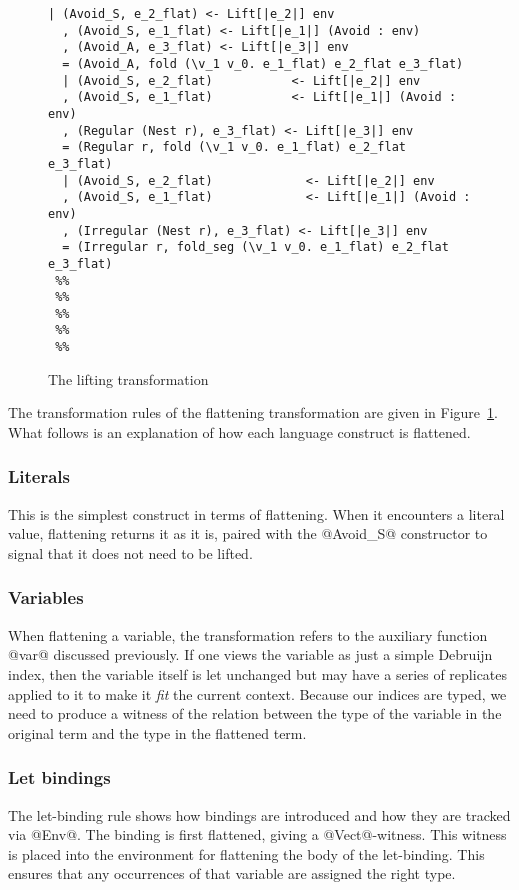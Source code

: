 \begin{figure}
\begin{lstlisting}[multicols=2,style=ndp]
  | (Avoid_S, e_2_flat) <- Lift[|e_2|] env
  , (Avoid_S, e_1_flat) <- Lift[|e_1|] (Avoid : env)
  , (Avoid_A, e_3_flat) <- Lift[|e_3|] env
  = (Avoid_A, fold (\v_1 v_0. e_1_flat) e_2_flat e_3_flat)
  | (Avoid_S, e_2_flat)           <- Lift[|e_2|] env
  , (Avoid_S, e_1_flat)           <- Lift[|e_1|] (Avoid : env)
  , (Regular (Nest r), e_3_flat) <- Lift[|e_3|] env
  = (Regular r, fold (\v_1 v_0. e_1_flat) e_2_flat e_3_flat)
  | (Avoid_S, e_2_flat)             <- Lift[|e_2|] env
  , (Avoid_S, e_1_flat)             <- Lift[|e_1|] (Avoid : env)
  , (Irregular (Nest r), e_3_flat) <- Lift[|e_3|] env
  = (Irregular r, fold_seg (\v_1 v_0. e_1_flat) e_2_flat e_3_flat)
 %%
 %%
 %%
 %%
 %%
\end{lstlisting}
\caption{The lifting transformation}
\label{fig:lifting-transform}
\end{figure}

The transformation rules of the flattening transformation are given in Figure~\ref{fig:lifting-transform}. What follows is an explanation of how each language construct is flattened.

\subsubsection{Literals}
This is the simplest construct in terms of flattening. When it encounters a literal value, flattening returns it as it is, paired with the @Avoid_S@ constructor to signal that it does not need to be lifted.

\subsubsection{Variables }
When flattening a variable, the transformation refers to the auxiliary function @var@ discussed previously. If one views the variable as just a simple Debruijn index, then the variable itself is let unchanged but may have a series of replicates applied to it to make it \emph{fit} the current context. Because our indices are typed, we need to produce a witness of the relation between the type of the variable in the original term and the type in the flattened term.

\subsubsection{Let bindings}
The let-binding rule shows how bindings are introduced and how they are tracked via @Env@. The binding is first flattened, giving a @Vect@-witness. This witness is placed into the environment for flattening the body of the let-binding. This ensures that any occurrences of that variable are assigned the right type.

